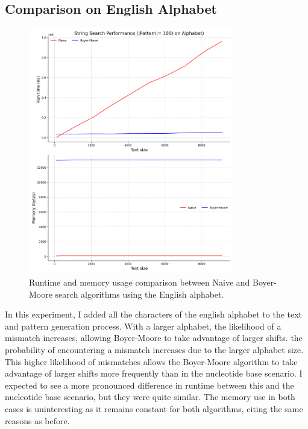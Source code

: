 \documentclass[11pt, letterpaper]{article}
\begin{document}
\center
\subsection{Comparison on English Alphabet}
\begin{figure}[H]
  \centering
  \includegraphics[width=0.8\textwidth]{alphabet_search.png}
  \caption{Runtime and memory usage comparison between Naive and Boyer-Moore search algorithms using the English alphabet.}
  \label{fig:english}
\end{figure}
\FloatBarrier
\flushleft
In this experiment, I added all the characters of the english alphabet to the text and pattern generation process.
With a larger alphabet, the likelihood of a mismatch increases, allowing Boyer-Moore to take advantage of larger shifts.
the probability of encountering a mismatch increases due to the larger alphabet size. 
This higher likelihood of mismatches allows the Boyer-Moore algorithm to take advantage of larger shifts more frequently than in the nucleotide base scenario. 
I expected to see a more pronounced difference in runtime between this and the nucleotide base scenario, but they were quite similar.
The memory use in both cases is uninteresting as it remains constant for both algorithms, citing the same reasons as before.

\center
\end{document}
